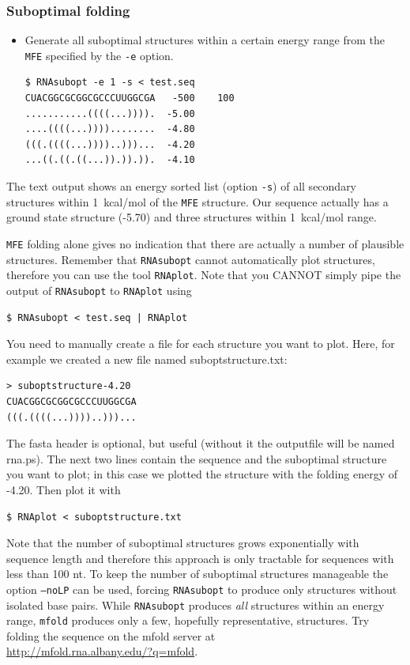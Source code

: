 \documentclass[a4paper]{article}
\newcommand{\frametitle}[1]{\subsubsection{#1}}
\begin{document}
\frametitle{Suboptimal folding}
\begin{itemize}
\item Generate all suboptimal structures within a certain energy
range from the \texttt{MFE} specified by the \texttt{-e} option.
\begin{verbatim}
$ RNAsubopt -e 1 -s < test.seq 
CUACGGCGCGGCGCCCUUGGCGA   -500    100
...........((((...)))).  -5.00
....((((...))))........  -4.80
(((.((((...))))..)))...  -4.20
...((.((.((...)).)).)).  -4.10
\end{verbatim}%
\end{itemize}
\noindent
The text output shows an energy sorted list (option \texttt{-s}) of all
secondary structures within 1~kcal/mol of the \texttt{MFE}
structure. Our sequence actually has a ground state structure (-5.70) and three
structures within 1~kcal/mol range. 

\texttt{MFE} folding alone gives no
indication that there are actually a number of plausible structures.
Remember that \texttt{RNAsubopt} cannot automatically plot structures, therefore
you can use the tool \texttt{RNAplot}. Note that you CANNOT simply pipe the 
output of \texttt{RNAsubopt} to \texttt{RNAplot} using
\begin{verbatim} 
$ RNAsubopt < test.seq | RNAplot
\end{verbatim}
You need to manually create a file for each structure you want to plot. Here, for example we created a new file named suboptstructure.txt:
\begin{verbatim}
> suboptstructure-4.20
CUACGGCGCGGCGCCCUUGGCGA
(((.((((...))))..)))...
\end{verbatim}
The fasta header is optional, but useful (without it the outputfile will be named rna.ps). 
The next two lines contain the sequence and the suboptimal structure you want to plot; 
in this case we plotted the structure with the folding energy of -4.20.
Then plot it with 
\begin{verbatim}
$ RNAplot < suboptstructure.txt
\end{verbatim}

Note that the number of suboptimal structures grows exponentially with
sequence length and therefore this approach is only tractable for
sequences with less than 100 nt. To keep the number of suboptimal
structures manageable the option \texttt{--noLP} can be used, forcing
\texttt{RNAsubopt} to produce only structures without isolated base
pairs. While \texttt{RNAsubopt} produces \emph{all} structures within an
energy range, \texttt{mfold} produces only a few, hopefully representative,
structures. Try folding the sequence on the mfold
server at \\
\url{http://mfold.rna.albany.edu/?q=mfold}.\\
\end{document}
